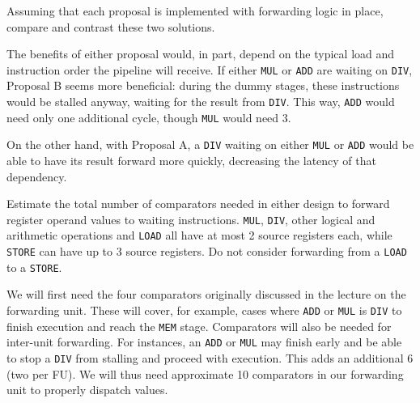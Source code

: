 \documentclass[12pt,letterpaper]{hmcpset}
\begin{document}
\begin{problem}[3c]
Assuming that each proposal is implemented with forwarding logic in place, compare and contrast these two solutions.
\end{problem}

\begin{solution}
The benefits of either proposal would, in part, depend on the typical load and instruction order the pipeline will receive.  If either \texttt{MUL} or \texttt{ADD} are waiting on \texttt{DIV}, Proposal B seems more beneficial: during the dummy stages, these instructions would be stalled anyway, waiting for the result from \texttt{DIV}.  This way, \texttt{ADD} would need only one additional cycle, though \texttt{MUL} would need 3.

On the other hand, with Proposal A, a \texttt{DIV} waiting on either \texttt{MUL} or \texttt{ADD} would be able to have its result forward more quickly, decreasing the latency of that dependency.   
\end{solution}

\begin{problem}[3d]
Estimate the total number of comparators needed in either design to forward register operand values to waiting instructions.  \texttt{MUL}, \texttt{DIV}, other logical and arithmetic operations and \texttt{LOAD} all have at most 2 source registers each, while \texttt{STORE} can have up to 3 source registers.  Do not consider forwarding from a \texttt{LOAD} to a \texttt{STORE}.
\end{problem}

\begin{solution}
We will first need the four comparators originally discussed in the lecture on the forwarding unit. These will cover, for example, cases where \texttt{ADD} or \texttt{MUL} is \texttt{DIV} to finish execution and reach the \texttt{MEM} stage.  Comparators will also be needed for inter-unit forwarding.  For instances, an \texttt{ADD} or \texttt{MUL} may finish early and be able to stop a \texttt{DIV} from stalling and proceed with execution.  This adds an additional 6 (two per FU).  We will thus need approximate 10 comparators in our forwarding unit to properly dispatch values.
\end{solution}
\end{document}
